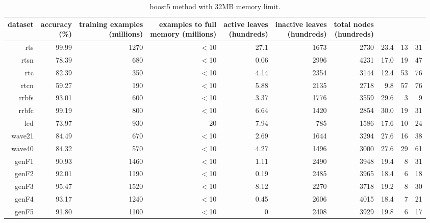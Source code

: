 \clearpage
\begin{table}
\caption{{\sc boost5} method with 32MB memory limit.}
\label{tab:boost5-32MB}
\centering
\begin{tabular}{|r|r|r|r|r|r|r|r|r|r|}
\hline
dataset	&
\rotatebox{90}{\parbox{9em}{accuracy\\(\%)}} &
\rotatebox{90}{\parbox{9em}{training examples\\(millions)}} &
\rotatebox{90}{\parbox{9em}{examples to full\\memory (millions)}} &
\rotatebox{90}{\parbox{9em}{active leaves\\(hundreds)}} &
\rotatebox{90}{\parbox{9em}{inactive leaves\\(hundreds)}} &
\rotatebox{90}{\parbox{9em}{total nodes\\(hundreds)}} &
\rotatebox{90}{\parbox{9em}{average tree depth}}	&
\rotatebox{90}{\parbox{9em}{training speed (\%)}} &
\rotatebox{90}{\parbox{9em}{prediction speed (\%)}} \\
\hline
{\sc rts} & 99.99 & 1270 & $<$10 & 27.1 & 1673 & 2730 & 23.4 & 13 & 31 \\
{\sc rtsn} & 78.39 & 680 & $<$10 & 0.06 & 2996 & 4231 & 17.0 & 19 & 47 \\
{\sc rtc} & 82.39 & 350 & $<$10 & 4.14 & 2354 & 3144 & 12.4 & 53 & 76 \\
{\sc rtcn} & 59.27 & 190 & $<$10 & 5.88 & 2135 & 2718 & 9.8 & 57 & 76 \\
{\sc rrbfs} & 93.01 & 600 & $<$10 & 3.37 & 1776 & 3559 & 29.6 & 3 & 9 \\
{\sc rrbfc} & 99.19 & 800 & $<$10 & 6.64 & 1420 & 2854 & 30.0 & 19 & 31 \\
{\sc led} & 73.97 & 930 & 20 & 7.94 & 785 & 1586 & 17.6 & 10 & 24 \\
{\sc wave21} & 84.49 & 670 & $<$10 & 2.69 & 1644 & 3294 & 27.6 & 16 & 38 \\
{\sc wave40} & 84.32 & 570 & $<$10 & 4.27 & 1496 & 3000 & 27.6 & 29 & 61 \\
{\sc genF1} & 90.93 & 1460 & $<$10 & 1.11 & 2490 & 3948 & 19.4 & 8 & 31 \\
{\sc genF2} & 92.01 & 1190 & $<$10 & 0.19 & 2485 & 3965 & 18.4 & 6 & 18 \\
{\sc genF3} & 95.47 & 1520 & $<$10 & 8.12 & 2270 & 3718 & 19.2 & 8 & 30 \\
{\sc genF4} & 93.17 & 1240 & $<$10 & 0.45 & 2606 & 4015 & 18.4 & 7 & 21 \\
{\sc genF5} & 91.80 & 1100 & $<$10 & 0 & 2408 & 3929 & 19.8 & 6 & 17 \\

\end{tabular}
\end{table}
